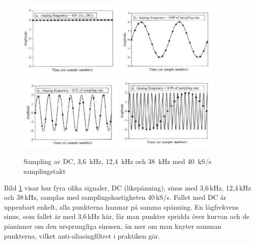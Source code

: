 \begin{figure}
\begin{center}
\includegraphics[width=0.45\textwidth]{images/cropped_pdfs/bild_2_1-38.pdf}
\includegraphics[width=0.45\textwidth]{images/cropped_pdfs/bild_2_1-39.pdf}
\includegraphics[width=0.45\textwidth]{images/cropped_pdfs/bild_2_1-40.pdf}
\includegraphics[width=0.45\textwidth]{images/cropped_pdfs/bild_2_1-41.pdf}
\caption{Sampling av DC, 3,6~kHz, 12,4~kHz och 38~kHz med 40~kS/s samplingstakt}
\label{fig:BildII1-38}
\end{center}
\end{figure}

Bild \ref{fig:BildII1-38} visar hur fyra olika signaler, DC (likspänning), 
sinus med
3,6\,kHz, 12,4\,kHz och 38\,kHz, samplas med samplingshastigheten 40\,kS/s.
Fallet med DC är uppenbart enkelt, alla punkterna hamnar på samma spänning.
En lågfrekvens sinus, som fallet är med 3,6\,kHz här, får man punkter spridda
över kurvan och de påminner om den ursprungliga sinusen, än mer om man knyter
samman punkterna, vilket anti-aliasingfiltret i praktiken gör.

